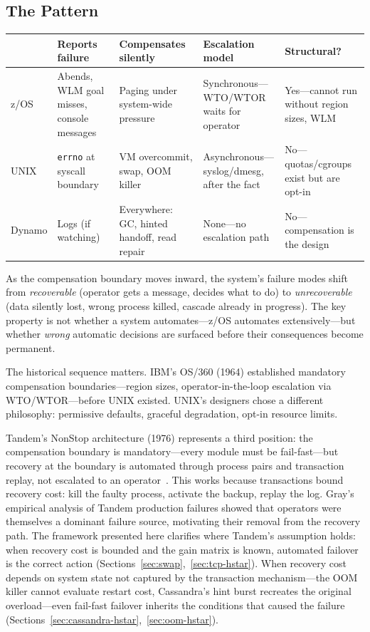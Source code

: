 \documentclass[11pt]{article}
\begin{document}
\subsection{The Pattern}

\begin{small}
\noindent\begin{tabularx}{\textwidth}{@{}lXXXX@{}}
\toprule
 & Reports failure & Compensates silently & Escalation model & Structural? \\
\midrule
z/OS & Abends, WLM goal misses, console messages & Paging under system-wide pressure
  & Synchronous---WTO/WTOR waits for operator & Yes---cannot run without region sizes, WLM \\
UNIX & \texttt{errno} at syscall boundary & VM overcommit, swap, OOM killer
  & Asynchronous---syslog/dmesg, after the fact & No---quotas/cgroups exist but are opt-in \\
Dynamo & Logs (if watching) & Everywhere: GC, hinted handoff, read repair
  & None---no escalation path & No---compensation is the design \\
\bottomrule
\end{tabularx}
\end{small}

As the compensation boundary moves inward, the system's failure modes shift from
\emph{recoverable} (operator gets a message, decides what to do) to
\emph{unrecoverable} (data silently lost, wrong process killed, cascade already
in progress). The key property is not whether a system automates---z/OS automates
extensively---but whether \emph{wrong} automatic decisions are surfaced before
their consequences become permanent.

The historical sequence matters. IBM's OS/360 (1964) established mandatory
compensation boundaries---region sizes, operator-in-the-loop escalation via
WTO/WTOR---before UNIX existed. UNIX's designers chose a different philosophy:
permissive defaults, graceful degradation, opt-in resource limits.

Tandem's NonStop architecture (1976) represents a third position: the
compensation boundary is mandatory---every module must be
fail-fast---but recovery at the boundary is automated through process pairs
and transaction replay, not escalated to an
operator~\cite{gray1985why}. This works because transactions bound
recovery cost: kill the faulty process, activate the backup, replay the
log. Gray's empirical analysis of Tandem production failures showed that
operators were themselves a dominant failure source, motivating their
removal from the recovery path. The framework presented here clarifies
where Tandem's assumption holds: when recovery cost is bounded and the
gain matrix is known, automated failover is the correct action
(Sections~\ref{sec:swap},~\ref{sec:tcp-hstar}). When recovery cost
depends on system state not captured by the transaction
mechanism---the OOM killer cannot evaluate restart cost, Cassandra's
hint burst recreates the original overload---even fail-fast failover
inherits the conditions that caused the failure
(Sections~\ref{sec:cassandra-hstar},~\ref{sec:oom-hstar}).
\end{document}

